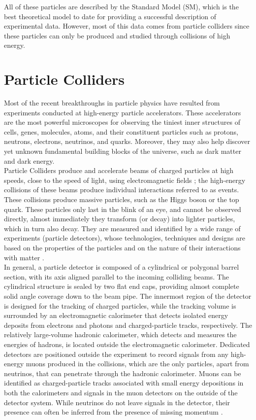 All of these particles are described by the Standard Model (SM), which is the best theoretical model to date for providing a successful description of experimental data. However, most of this data comes from particle colliders since these particles can only be produced and studied through collisions of high energy.

\section{Particle Colliders}

Most of the recent breakthroughs in particle physics have resulted from experiments conducted at high-energy particle accelerators. These accelerators are the most powerful microscopes for observing the tiniest inner structures of cells, genes, molecules, atoms, and their constituent particles such as protons, neutrons, electrons, neutrinos, and quarks. Moreover, they may also help discover yet unknown fundamental building blocks of the universe, such as dark matter and dark energy.\\

Particle Colliders produce and accelerate beams of charged particles at high speeds, close to the speed of light,  using electromagnetic fields ; the high-energy collisions of these beams produce individual interactions referred to as events. These collisions produce massive particles, such as the Higgs boson or the top quark. These particles only last in the blink of an eye, and cannot be observed directly, almost immediately they transform (or decay) into lighter particles, which in turn also decay. They are measured and identified by a wide range of experiments (particle detectors), whose technologies, techniques and designs are based on the properties of the particles and on the nature of their interactions with matter \cite{thomson_2013}.\\

In general, a particle detector is composed of a cylindrical or polygonal barrel section, with its axis aligned parallel to the incoming colliding beams. The cylindrical structure is sealed by two flat end caps, providing almost complete solid angle coverage down to the beam pipe. The innermost region of the detector is designed for the tracking of charged particles, while the tracking volume is surrounded by an electromagnetic calorimeter that detects isolated energy deposits from electrons and photons and charged-particle tracks, respectively. The relatively large-volume hadronic calorimeter, which detects and measures the energies of hadrons, is located outside the electromagnetic calorimeter. Dedicated detectors are positioned outside the experiment to record signals from any high-energy muons produced in the collisions, which are the only particles, apart from neutrinos, that can penetrate through the hadronic calorimeter. Muons can be identified as charged-particle tracks associated with small energy depositions in both the calorimeters and signals in the muon detectors on the outside of the detector system. While neutrinos do not leave signals in the detector, their presence can often be inferred from the presence of missing momentum \cite{thomson_2013}.\\

